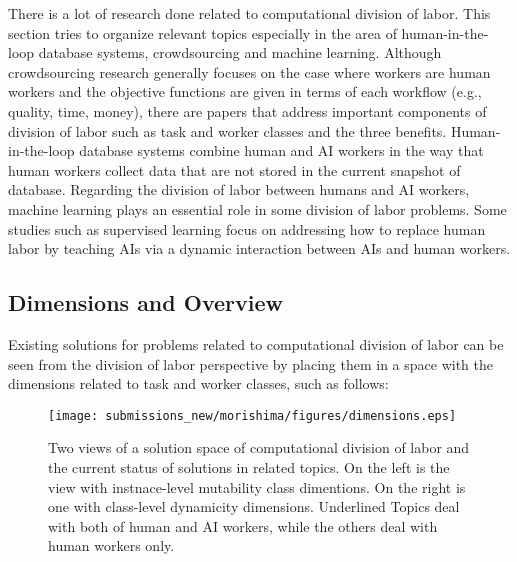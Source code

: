 
There is a lot of research done related to computational division of labor. 
This section tries to organize relevant topics especially in the area of human-in-the-loop database systems, crowdsourcing and machine learning.
Although crowdsourcing research generally focuses on the case where workers are human workers and the objective functions are given in terms of each workflow (e.g., quality, time, money), 
there are papers that address important components of division of labor such as task and worker classes and the three benefits.
Human-in-the-loop database systems combine human and AI workers in the way that human workers collect data that are not stored in the current snapshot of database.
Regarding the division of labor between humans and AI workers, machine learning plays an essential role in some division of labor problems.
Some studies such as supervised learning focus on addressing how to replace human labor by teaching AIs via a dynamic interaction between AIs and human workers.


\subsection{Dimensions and Overview}

Existing solutions for problems related to computational division of labor can be seen from the division of labor perspective by placing them in a space with the dimensions related to task and worker classes, such as follows:\\

\begin{figure}[t]
    \centering
    \texttt{[image: submissions\_new/morishima/figures/dimensions.eps]}
    \caption{Two views of a solution space of computational division of labor and the  current status of solutions in related topics. 
    On the left is the view with instnace-level mutability class dimentions.
    On the right is one with class-level dynamicity dimensions.
    Underlined Topics  deal with both of human and AI workers, while the others deal with human workers only.}
    \label{fig:dimensions}
\end{figure}

